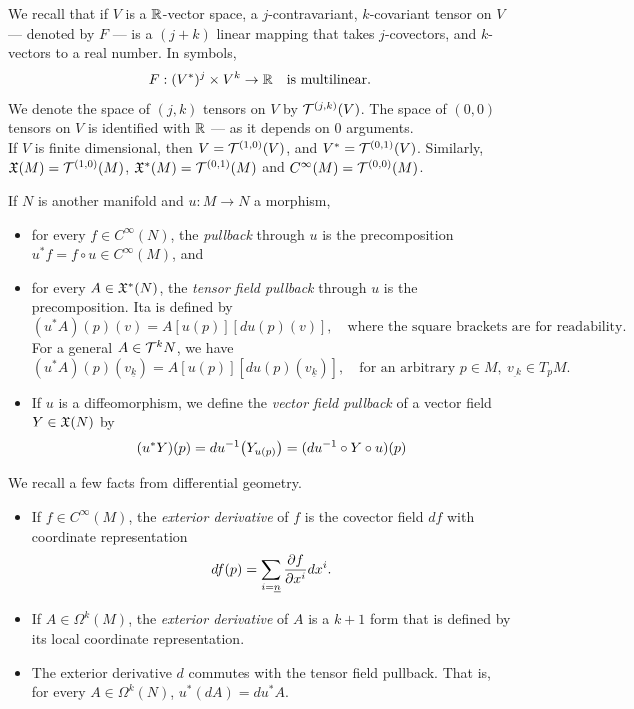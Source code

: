 \documentclass[../main-v2-manifolds.tex]{subfiles}
\begin{document}
\begin{note}
    We recall that if $V$ is a $\mathbb{R}$-vector space, a $j$-contravariant, $k$-covariant tensor on $V$ --- denoted by $F$ --- is a $(j+k)$ linear mapping that takes $j$-covectors, and $k$-vectors to a real number. In symbols,
    \[
        F: (V^*)^j \times V^k\to\mathbb{R}\quad\text{is multilinear.}
    \]
    We denote the space of $(j,k)$ tensors on $V$ by $\mathcal{T}^{(j,k)}(V)$. The space of $(0,0)$ tensors on $V$ is identified with $\mathbb{R}$ --- as it depends on $0$ arguments. \\
    
    If $V$ is finite dimensional, then $V=\mathcal{T}^{(1,0)}(V)$, and $V^* = \mathcal{T}^{(0,1)}(V)$.
    Similarly, $\mathfrak{X}(M) = \mathcal{T}^{(1,0)}(M)$,  $\mathfrak{X}^*(M) = \mathcal{T}^{(0,1)}(M)$ and $C^\infty(M) = \mathcal{T}^{(0,0)}(M)$.
\end{note}
If $N$ is another manifold and $u: M\to N$ a morphism, 
\begin{itemize}
    \item for every $f\in C^\infty(N)$, the \emph{pullback} through $u$ is the precomposition $u^*f = f\circ u\in C^\infty(M)$, and
    \item for every $A\in\mathfrak{X}^*(N)$, the \emph{tensor field pullback} through $u$ is the precomposition.  Ita is defined by
    \[
        (u^*A)(p)(v) = A[u(p)][du(p)(v)],\quad\text{where the square brackets are for readability.}
    \]
    For a general $A\in \mathcal{T}^{k}N$, we have
    \[
        (u^*A)(p)(v_{\underline{k}}) = A[u(p)][du(p)(v_{\underline{k}})],\quad\text{for an arbitrary }p\in M,\: v_{\underline{}k}\in T_pM.
    \]
    \item If $u$ is a diffeomorphism, we define the \emph{vector field pullback} of a vector field $Y\in\mathfrak{X}(N)$ by
    \[
        (u^*Y)(p) = du^{-1}\qty(Y_{u(p)}) = (du^{-1}\circ Y\circ u)(p)
    \]
\end{itemize}
We recall a few facts from differential geometry.
\begin{itemize}
    \item If $f\in C^\infty(M)$, the \emph{exterior derivative} of $f$ is the covector field $df$ with coordinate representation
    \[
        df(p) = \sum_{i=\underline{n}}\pdv{f}{x^i}dx^i.
    \]
    \item If $A\in \Omega^k(M)$, the \emph{exterior derivative} of $A$ is a $k+1$ form that is defined by its local coordinate representation. 
    \item The exterior derivative $d$ commutes with the tensor field pullback. That is, for every $A\in \Omega^k(N)$, $u^*(dA) = du^*A$.
\end{itemize}
\end{document}
